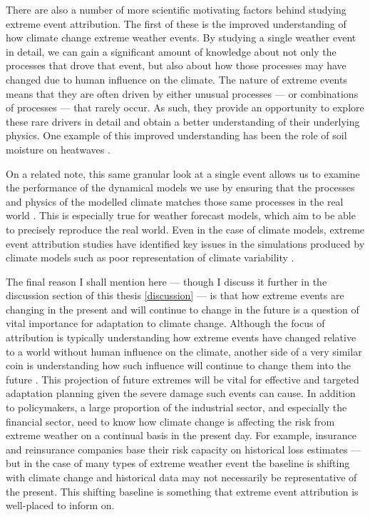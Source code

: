   There are also a number of more scientific motivating factors behind studying extreme event attribution. The first of these is the improved understanding of how climate change extreme weather events. By studying a single weather event in detail, we can gain a significant amount of knowledge about not only the processes that drove that event, but also about how those processes may have changed due to human influence on the climate. The nature of extreme events means that they are often driven by either unusual processes --- or combinations of processes --- that rarely occur. As such, they provide an opportunity to explore these rare drivers in detail and obtain a better understanding of their underlying physics. One example of this improved understanding has been the role of soil moisture on heatwaves \citep{fischer_soil_2007,fischer_contribution_2007,wehrli_identifying_2019}. %

  On a related note, this same granular look at a single event allows us to examine the performance of the dynamical models we use by ensuring that the processes and physics of the modelled climate matches those same processes in the real world \citep{sillmann_understanding_2017,philip_protocol_2020}. This is especially true for weather forecast models, which aim to be able to precisely reproduce the real world. Even in the case of climate models, extreme event attribution studies have identified key issues in the simulations produced by climate models such as poor representation of climate variability \citep{bellprat_towards_2019,leach_anthropogenic_2020}.

  The final reason I shall mention here --- though I discuss it further in the discussion section of this thesis \ref{discussion} --- is that how extreme events are changing in the present and will continue to change in the future is a question of vital importance for adaptation to climate change. Although the focus of attribution is typically understanding how extreme events have changed relative to a world without human influence on the climate, another side of a very similar coin is understanding how such influence will continue to change them into the future \citep{harrington_integrating_2022}. This projection of future extremes will be vital for effective and targeted adaptation planning given the severe damage such events can cause. In addition to policymakers, a large proportion of the industrial sector, and especially the financial sector, need to know how climate change is affecting the risk from extreme weather on a continual basis in the present day. For example, insurance and reinsurance companies base their risk capacity on historical loss estimates --- but in the case of many types of extreme weather event the baseline is shifting with climate change and historical data may not necessarily be representative of the present. This shifting baseline is something that extreme event attribution is well-placed to inform on.

